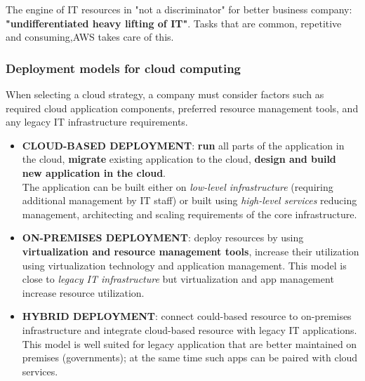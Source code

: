 \documentclass{article}
\theoremstyle{definition}
\begin{document}
The engine of IT resources in "not a discriminator" for better business company: \textbf{"undifferentiated heavy lifting of IT"}. Tasks that are common, repetitive and consuming,AWS takes care of this.\\

\subsubsection{Deployment models for cloud computing}
When selecting a cloud strategy, a company must consider factors such as required cloud application components, preferred resource management tools, and any legacy IT infrastructure requirements.
\begin{itemize}
    \item \textbf{CLOUD-BASED DEPLOYMENT}: \textbf{run} all parts of the application in the cloud, \textbf{migrate} existing application to the cloud, \textbf{design and build new application in the cloud}.\\
    The application can be built either on \textit{low-level infrastructure} (requiring additional management by IT staff) or built using \textit{high-level services} reducing management, architecting and scaling requirements of the core infrastructure.
    \item \textbf{ON-PREMISES DEPLOYMENT}: deploy resources by using \textbf{virtualization and resource management tools}, increase their utilization using virtualization technology and application management. This model is close to \textit{legacy IT infrastructure} but virtualization and app management increase resource utilization.
    \item \textbf{HYBRID DEPLOYMENT}: connect could-based resource to on-premises infrastructure and integrate cloud-based resource with legacy IT applications. This model is well suited for legacy application that are better maintained on premises (governments); at the same time such apps can be paired with cloud services.
\end{itemize}
\end{document}
